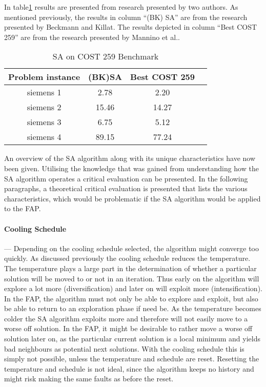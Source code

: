 In table\ref{tab:SA} results are presented from research presented by two authors. As mentioned previously, the results in column ``(BK) \gls{SA}'' are from the research presented by Beckmann and Killat\cite{BeKi99a}. The results depicted in column ``Best \gls{COST} 259'' are from the research presented by Mannino et al.\cite{MaOrRi02}.
\begin{table}[H]
\centering
	\begin{tabular}{| c | c | c | c |}
	\hline
    Problem instance & (BK)\gls{SA} & Best \gls{COST} 259 \\ \hline
	siemens 1 & 2.78 & 2.20\\ \hline
	siemens 2 & 15.46 & 14.27\\ \hline
	siemens 3 & 6.75 & 5.12\\ \hline
	siemens 4 & 89.15 & 77.24\\ \hline
	\end{tabular}
\caption{SA on \gls{COST} 259 Benchmark}
\label{tab:SA}
\end{table}


An overview of the \gls{SA} algorithm along with its unique characteristics have now been given. Utilising the knowledge that was gained from understanding how the \gls{SA} algorithm operates a critical evaluation can be presented. In the following paragraphs, a theoretical critical evaluation is presented that lists the various characteristics, which would be problematic if the \gls{SA} algorithm would be applied to the \gls{FAP}.

\paragraph{Cooling Schedule}
--- Depending on the cooling schedule selected, the algorithm might converge too quickly. As discussed previously the cooling schedule reduces the temperature. The temperature plays a large part in the determination of whether a particular solution will be moved to or not in an iteration. Thus early on the algorithm will explore a lot more (diversification) and later on will exploit more (intensification). In the \gls{FAP}, the algorithm must not only be able to explore and exploit, but also be able to return to an exploration phase if need be.
As the temperature becomes colder the \gls{SA} algorithm exploits more and therefore will not easily move to a worse off solution. In the \gls{FAP}, it might be desirable to rather move a worse off solution later on, as the particular current solution is a local minimum and yields bad neighbours as potential next solutions. With the cooling schedule this is simply not possible, unless the temperature and schedule are reset. Resetting the temperature and schedule is not ideal, since the algorithm keeps no history and might risk making the same faults as before the reset.
